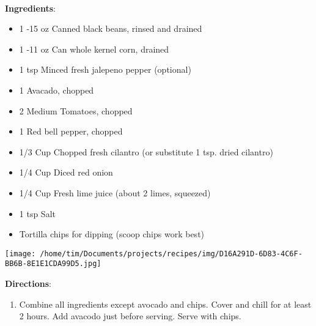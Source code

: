 \documentclass[11pt, twoside, openany]{book}
\begin{document}
 \label{black-bean-and-corn-salsa}\hfill\textit{}\\
\begin{minipage}[t]{0.8\linewidth}
\textbf{Ingredients}:\vspace{-3mm}
\begin{multicols}{2}
\begin{itemize}\setlength\itemsep{-1mm}
\item 1 -15 oz Canned black beans, rinsed and drained
\item 1 -11 oz Can whole kernel corn, drained
\item 1 tsp Minced fresh jalepeno pepper (optional)
\item 1 Avacado, chopped
\item 2 Medium Tomatoes, chopped
\item 1 Red bell pepper, chopped
\item 1/3 Cup Chopped fresh cilantro (or substitute 1 tsp. dried cilantro)
\item 1/4 Cup Diced red onion
\item 1/4 Cup Fresh lime juice (about 2 limes, squeezed)
\item 1 tsp Salt
\item Tortilla chips for dipping (scoop chips work best)
\end{itemize}
\end{multicols}
\end{minipage}
\begin{minipage}[t]{0.2\linewidth}
\centering \strut\vspace*{-\baselineskip}\newline
\texttt{[image: /home/tim/Documents/projects/recipes/img/D16A291D-6D83-4C6F-BB6B-8E1E1CDA99D5.jpg]}\\
\end{minipage}\vspace{3mm}
\textbf{Directions}:
\vspace{-3mm}\begin{enumerate}\setlength\itemsep{-1mm}
\item Combine all ingredients except avocado and chips. Cover and chill for at least 2 hours. Add avacodo just before serving. Serve with chips.
\end{enumerate}
 \label{amish-cinnamon-bread-(friendship-bread)}\hfill\textit{}\\
\end{document}
